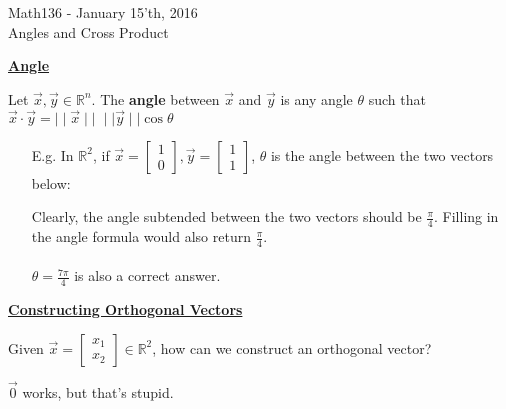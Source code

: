 \documentclass{letter}
\newcommand{\0}[1]{\begin{bmatrix}#1\end{bmatrix}}
\newcommand{\h}[1]{\underline{\textbf{#1}}}
\begin{document}
	\begin{center}
		\LARGE Math136 - January 15'th, 2016\\
		\large Angles and Cross Product
	\end{center}
	\vspace{0.25 in}
	
	\h{Angle}
	
	Let $\vec x, \vec y \in \mathbb{R}^n$. The \textbf{angle} between $\vec x$ and $\vec y$ is any angle $\theta$ such that $\vec x \cdot \vec y = \mid\mid \vec x \mid\mid\;\mid\mid\vec y \mid\mid \cos \theta$
	
	\begin{itemize}
		\item[E.g.] In $\mathbb{R}^2$, if $\vec x = \0{1\\0}, \vec y = \0{1\\1}$, $\theta$ is the angle between the two vectors below:
		
		\begin{center}
		\end{center}
		
		Clearly, the angle subtended between the two vectors should be $\frac{\pi}{4}$. Filling in the angle formula would also return $\frac{\pi}{4}$.\\\\
		$\theta = \frac{7\pi}{4}$ is also a correct answer.
	\end{itemize}
	
	\h{Constructing Orthogonal Vectors}
	
	Given $\vec x = \0{x_1\\x_2} \in \mathbb{R}^2$, how can we construct an orthogonal vector?
	
	$\vec 0$ works, but that's stupid.
	
\end{document}
